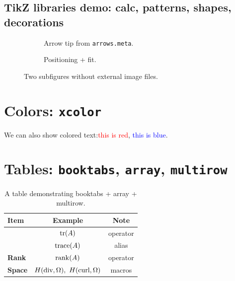 \documentclass[11pt,a4paper]{article}
\begin{document}
\subsection{TikZ libraries demo: calc, patterns, shapes, decorations}

\begin{figure}[htbp]
    \centering
    \begin{subfigure}[b]{0.47\textwidth}
        \centering
        \caption{Arrow tip from \texttt{arrows.meta}.}
    \end{subfigure}\hfill
    \begin{subfigure}[b]{0.47\textwidth}
        \centering
        \caption{Positioning + fit.}
    \end{subfigure}
    \caption{Two subfigures without external image files.}
\end{figure}


\section{Colors: \texttt{xcolor}}
We can also show colored text:\textcolor{red}{this is red}, \textcolor{blue}{this is blue}.



\section{Tables: \texttt{booktabs}, \texttt{array}, \texttt{multirow}}

\begin{table}[htbp]
    \centering
    \renewcommand{\arraystretch}{1.15}
    \begin{tabular}{>{\bfseries}l c c}
        \toprule
        Item & Example & Note \\
        \midrule
        \multirow{2}{*}{Trace} & $\operatorname{tr}(A)$ & operator \\
                               & $\operatorname{trace}(A)$ & alias \\
        Rank & $\operatorname{rank}(A)$ & operator \\
        Space & $\Hdiv,\ \Hcurl$ & macros \\
        \bottomrule
    \end{tabular}
    \caption{A table demonstrating booktabs + array + multirow.}
\end{table}
\end{document}
